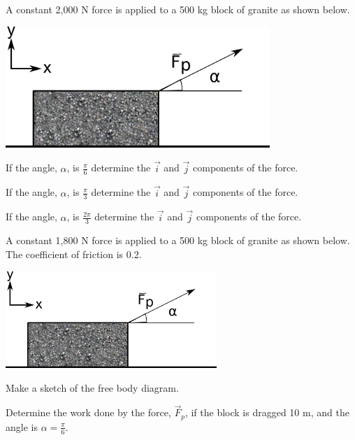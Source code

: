 


\begin{problem}
\item A constant 2,000 N force is applied to a 500 kg block of granite as shown
  below.

  \includegraphics[width=10cm]{ink/week7/dragBlock}

  \begin{subproblem}
  \item If the angle, $\alpha$, is $\frac{\pi}{6}$ determine the
    $\vec{i}$ and $\vec{j}$ components of the force.
    \vfill
  \item If the angle, $\alpha$, is $\frac{\pi}{3}$ determine the
    $\vec{i}$ and $\vec{j}$ components of the force.
    \vfill
  \item If the angle, $\alpha$, is $\frac{2\pi}{3}$ determine the
    $\vec{i}$ and $\vec{j}$ components of the force.
    \vfill
  \end{subproblem}

  \clearpage

\item A constant 1,800 N force is applied to a 500 kg block of granite as
  shown below. The coefficient of friction is 0.2.

  \includegraphics[width=8cm]{ink/week7/dragBlock}

  \begin{subproblem}
    \item Make a sketch of the free body diagram.
      \vspace{6em}
    \item Determine the work done by the force, $\vec{F}_p$, if the
      block is dragged 10 m, and the angle is $\alpha=\frac{\pi}{6}$.


\end{subproblem}
\end{problem}
